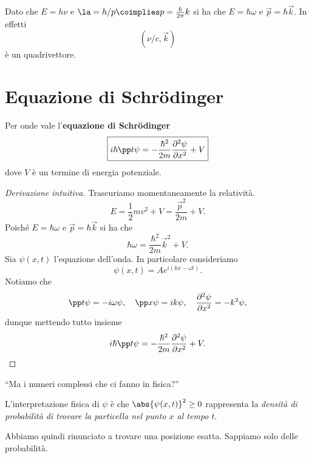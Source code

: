 \begin{remark}
Dato che $E=h\nu$ e $\la=h/p\coimplies p=\frac h{2\pi}k$ si ha che $E=\hbar\omega$ e $\vec p=\hbar \vec k$. In effetti
\[(\nu/c,\vec k)\]
\`e un quadrivettore.
\end{remark}


\section{Equazione di Schr\"odinger}

\begin{theorem}\label{EquazioneSchrodinger}
Per onde vale l'\textbf{equazione di Schr\"odinger}
\[\boxed{i\hbar \pp t\psi=-\frac{\hbar^2}{2m}\pps[2]x\psi +V}\]
dove $V$ \`e un termine di energia potenziale.
\end{theorem}
\begin{proof}[Derivazione intuitiva]
Trascuriamo momentaneamente la relativit\`a.
\[E=\frac12mv^2+V=\frac{\vec p^2}{2m}+V.\]
Poich\'e $E=\hbar \omega$ e $\vec p=\hbar \vec k$ si ha che
\[\hbar \omega=\frac{\hbar^2}{2m}\vec k^2+V.\]
Sia $\psi(x,t)$ l'equazione dell'onda. In particolare consideriamo
\[\psi(x,t)=Ae^{i(kx-\omega t)}.\]
Notiamo che
\[\pp t\psi=-i\omega\psi,\quad \pp x\psi=ik\psi,\quad \pps[2]x\psi=-k^2\psi,\]
dunque mettendo tutto insieme
\[i\hbar \pp t\psi=-\frac{\hbar^2}{2m}\pps[2]x\psi +V.\]
\end{proof}
\begin{center}
``Ma i numeri complessi che ci fanno in fisica?''
\end{center}
L'interpretazione fisica di $\psi$ \`e che $\abs{\psi(x,t)}^2\geq 0$ rappresenta la \textit{densit\`a di probabilit\`a di trovare la particella nel punto $x$ al tempo $t$}.
\bigskip

\noindent
Abbiamo quindi rinunciato a trovare una posizione esatta. Sappiamo solo delle probabilit\`a.